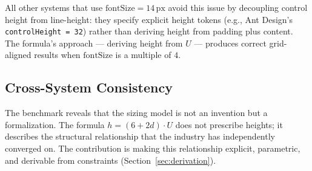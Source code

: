 All other systems that use $\text{fontSize} = 14\,\text{px}$ avoid this issue by decoupling control height from line-height: they specify explicit height tokens (e.g., Ant Design's \texttt{controlHeight = 32}) rather than deriving height from padding plus content. The formula's approach --- deriving height from $U$ --- produces correct grid-aligned results when $\text{fontSize}$ is a multiple of $4$.

\subsection{Cross-System Consistency}

The benchmark reveals that the sizing model is not an invention but a formalization. The formula $h = (6 + 2d) \cdot U$ does not prescribe heights; it describes the structural relationship that the industry has independently converged on. The contribution is making this relationship explicit, parametric, and derivable from constraints (Section~\ref{sec:derivation}).
